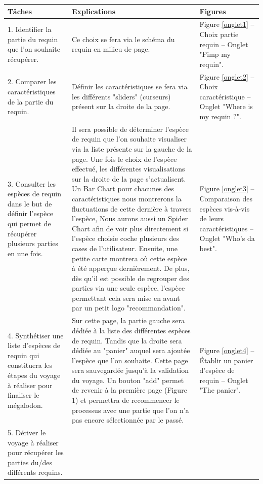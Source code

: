 \documentclass{article}
\begin{document}
\begin{center}
	\begin{tabular}{|p{3.5cm}|p{7cm}|p{3.5cm}|}
		\hline
		Tâches
		 &
		Explications
		 &
		Figures
		\\\hline
		1. Identifier la partie du requin que l’on souhaite récupérer.
		 &
		Ce choix se fera via le schéma du requin en milieu de page.
		 &

		Figure \ref{onglet1} – Choix partie requin – Onglet "Pimp my requin".
		\\\hline
		2. Comparer les caractéristiques de la partie du requin.
		 &
		Définir les caractéristiques se fera via les différents "sliders" (curseurs) présent sur la droite de la page.
		 &
		Figure \ref{onglet2} – Choix caractéristique – Onglet "Where is my requin ?".
		\\\hline
		3. Consulter les espèces de requin dans le but de définir l’espèce qui permet de récupérer plusieurs parties en une fois.
		 &
		Il sera possible de déterminer l’espèce de requin que l’on souhaite visualiser via la liste présente sur la gauche de la page. Une fois le choix de l’espèce effectué, les différentes visualisations sur la droite de la page s'actualisent. Un Bar Chart pour chacunes des caractéristiques nous montrerons la fluctuations de cette dernière à travers l'espèce, Nous aurons aussi un Spider Chart afin de voir plus directement si l'espèce choisie coche plusieurs des cases de l'utilisateur. Ensuite, une petite carte montrera où cette espèce à été apperçue dernièrement. De plus, dès qu'il est possible de regrouper des parties via une seule espèce, l'espèce permettant cela sera mise en avant par un petit logo "recommandation".
		 &
		Figure \ref{onglet3} – Comparaison des espèces vis-à-vis de leurs caractéristiques – Onglet "Who's da best".
		\\\hline
		4. Synthétiser une liste d’espèces de requin qui constituera les étapes du voyage à réaliser pour finaliser le mégalodon.
		 &
		Sur cette page, la partie gauche sera dédiée à la liste des différentes espèces de requin. Tandis que la droite sera dédiée au "panier" auquel sera ajoutée l’espèce que l’on souhaite. Cette page sera sauvegardée jusqu’à la validation du voyage. Un bouton "add" permet de revenir à la première page (Figure 1) et permettra de recommencer le processus avec une partie que l’on n'a pas encore sélectionnée par le passé.
		 &
		Figure \ref{onglet4} – Établir un panier d’espèce de requin – Onglet "The panier".
		\\\hline
		5. Dériver le voyage à réaliser pour récupérer les parties du/des différents requins.

\end{tabular}
\end{center}
\end{document}
